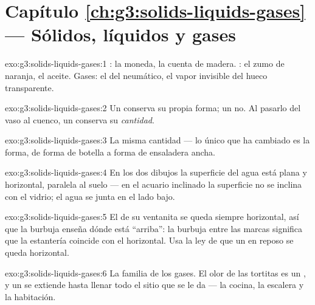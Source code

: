 \section*{Capítulo \ref{ch:g3:solids-liquids-gases} --- Sólidos, líquidos y gases}

\begin{solution}{exo:g3:solids-liquids-gases:1}
: la moneda, la cuenta de madera. : el zumo de
naranja, el aceite. Gases: el  del neumático, el vapor invisible
del hueco transparente.
\end{solution}

\begin{solution}{exo:g3:solids-liquids-gases:2}
Un  conserva su propia forma; un  no. Al pasarlo del
vaso al cuenco, un  conserva su \emph{cantidad}.
\end{solution}

\begin{solution}{exo:g3:solids-liquids-gases:3}
La misma cantidad --- lo único que ha cambiado es la forma, de forma
de botella a forma de ensaladera ancha.
\end{solution}

\begin{solution}{exo:g3:solids-liquids-gases:4}
En los dos dibujos la superficie del agua está plana y horizontal,
paralela al suelo --- en el acuario inclinado la superficie no se
inclina con el vidrio; el agua se junta en el lado bajo.
\end{solution}

\begin{solution}{exo:g3:solids-liquids-gases:5}
El  de su ventanita se queda siempre horizontal, así que la
burbuja enseña dónde está ``arriba'': la burbuja entre las marcas
significa que la estantería coincide con el  horizontal. Usa
la ley de que un  en reposo se queda horizontal.
\end{solution}

\begin{solution}{exo:g3:solids-liquids-gases:6}
La familia de los gases. El olor de las tortitas es un , y un
 se extiende hasta llenar todo el sitio que se le da --- la
cocina, la escalera y la habitación.
\end{solution}

